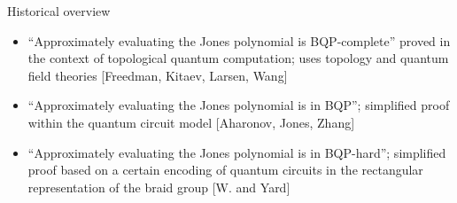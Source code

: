 \documentclass{prosper}
\renewcommand{\>}{\rangle}
\newcommand{\<}{\langle}
\begin{document}
\begin{slide}{Historical overview}
\begin{itemize}
\item ``Approximately evaluating the Jones polynomial is BQP-complete'' proved in the context of topological quantum computation; uses topology and quantum field theories [Freedman, Kitaev, Larsen, Wang]
\item ``Approximately evaluating the Jones polynomial is in BQP''; simplified proof within the quantum circuit model [Aharonov, Jones, Zhang]
\item ``Approximately evaluating the Jones polynomial is in BQP-hard''; simplified proof based on a certain encoding of quantum circuits in the rectangular representation of the braid group [W. and Yard]
\end{itemize}
\end{slide}
\end{document}
